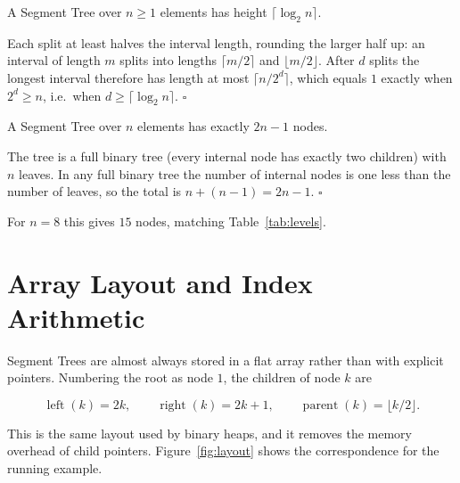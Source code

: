 \documentclass[
  11pt,
  a4paper,
  twoside=false,
  numbers=noenddot,
  headings=big,
  parskip=half,
  toc=bibliography,
  toc=listof,
  bibliography=totoc
]{scrreprt}
\newcounter{example}[chapter]
\newenvironment{proof}[1][Proof]{\par\noindent{\bfseries\sffamily\color{navy}#1.}\enspace}{\hfill$\square$\par\medskip}
\begin{document}
\begin{lem}[Height]\label{lem:height}
A Segment Tree over $n\ge 1$ elements has height $\lceil \log_2 n\rceil$.
\end{lem}
\begin{proof}
Each split at least halves the interval length, rounding the larger half up: an interval of length $m$ splits into lengths $\lceil m/2\rceil$ and $\lfloor m/2\rfloor$. After $d$ splits the longest interval therefore has length at most $\lceil n/2^{d}\rceil$, which equals $1$ exactly when $2^d\ge n$, i.e.\ when $d\ge\lceil\log_2 n\rceil$.
\end{proof}

\begin{lem}\label{lem:nodes}
A Segment Tree over $n$ elements has exactly $2n-1$ nodes.
\end{lem}
\begin{proof}
The tree is a full binary tree (every internal node has exactly two children) with $n$ leaves. In any full binary tree the number of internal nodes is one less than the number of leaves, so the total is $n+(n-1)=2n-1$.
\end{proof}

For $n=8$ this gives $15$ nodes, matching Table~\ref{tab:levels}.

\section{Array Layout and Index Arithmetic}
Segment Trees are almost always stored in a flat array rather than with explicit pointers. Numbering the root as node $1$, the children of node $k$ are

\begin{equation}
\operatorname{left}(k) = 2k, \qquad \operatorname{right}(k) = 2k+1, \qquad \operatorname{parent}(k)=\lfloor k/2\rfloor.
\label{eq:heap}
\end{equation}

This is the same layout used by binary heaps, and it removes the memory overhead of child pointers. Figure~\ref{fig:layout} shows the correspondence for the running example.
\end{document}
